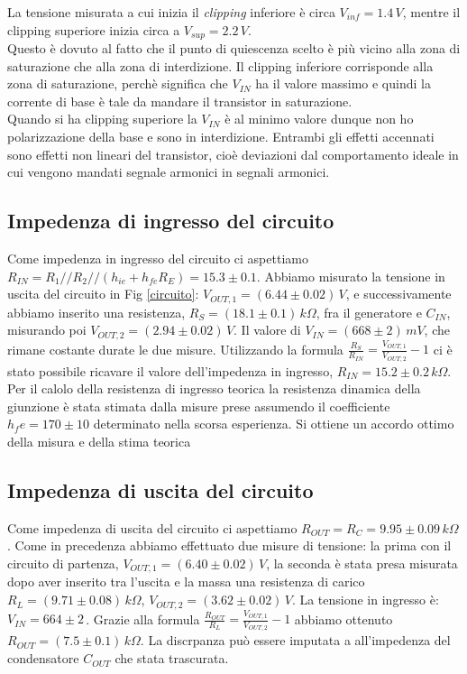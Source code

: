 \documentclass[10pt,a4paper]{article}
\begin{document}
La tensione misurata a cui inizia il \emph{clipping} inferiore è circa $V_{inf} = 1.4 \,V$, mentre il clipping superiore inizia circa a $V_{sup} = 2.2 \, V$.\\
Questo è dovuto al fatto che il punto di quiescenza scelto è più vicino alla zona di saturazione che alla zona di interdizione. Il clipping inferiore corrisponde alla zona di saturazione, perchè significa che $V_{IN}$ ha il valore massimo e quindi la corrente di base è tale da mandare il transistor in saturazione.\\
Quando si ha clipping superiore la $V_{IN}$ è al minimo valore dunque non ho polarizzazione della base e sono in interdizione.
Entrambi gli effetti accennati sono effetti non lineari del transistor, cioè deviazioni dal comportamento ideale in cui vengono mandati segnale armonici in segnali armonici.\\


\subsection{Impedenza di ingresso del circuito}
Come impedenza in ingresso del circuito ci aspettiamo $R_{IN}=R_1//R_2//(h_{ie}+h_{fe}R_E) = 15.3\pm0.1$.
Abbiamo misurato la tensione in uscita del circuito in Fig \ref{circuito}: $V_{OUT,1} = (6.44\pm0.02) \, V$, e successivamente abbiamo inserito una resistenza, $R_S= (18.1\pm0.1) \, k\Omega$, fra il generatore e $C_{IN}$, misurando poi $V_{OUT,2}= (2.94 \pm 0.02) \, V$. Il valore di $V_{IN} = (668 \pm 2) \, mV$, che rimane costante durate le due misure. Utilizzando la formula $\frac{R_S}{R_{IN}}=\frac{V_{OUT,1}}{V_{OUT,2}}-1$ ci è stato possibile ricavare il valore dell'impedenza in ingresso, $R_{IN}= 15.2\pm0.2\, k\Omega$. 
Per il calolo della resistenza di ingresso teorica la resistenza dinamica della giunzione è stata stimata dalla misure prese assumendo il coefficiente $h_fe = 170\pm10$ determinato nella scorsa esperienza. Si ottiene un accordo ottimo della misura e della stima teorica

\subsection{Impedenza di uscita del circuito}
Come impedenza di uscita del circuito ci aspettiamo $R_{OUT}= R_C = 9.95\pm0.09\, k\Omega$. Come in precedenza abbiamo effettuato due misure di tensione: la prima con il circuito di partenza, $V_{OUT,1}= (6.40\pm0.02) \, V$, la seconda è stata presa misurata dopo aver inserito tra l'uscita e la massa una resistenza di carico $R_L = (9.71 \pm 0.08) \, k\Omega$, $V_{OUT,2}= (3.62\pm0.02)\,V$. La tensione in ingresso è: $V_{IN} = 664 \pm 2 \,$. Grazie alla formula $\frac{R_{OUT}}{R_{L}}=\frac{V_{OUT,1}}{V_{OUT,2}}-1$ abbiamo ottenuto $R_{OUT}= (7.5\pm0.1)\, k\Omega$. La discrpanza può essere imputata a all'impedenza del condensatore $C_{OUT}$ che stata trascurata.
\end{document}
